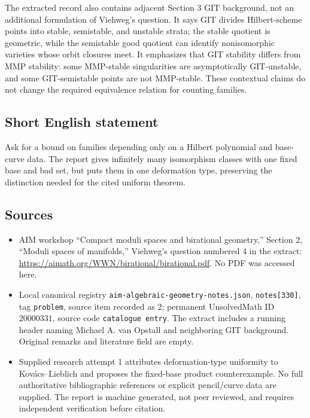 \documentclass[11pt]{article}
\begin{document}
The extracted record also contains adjacent Section 3 GIT background, not an additional formulation of Viehweg's question. It says GIT divides Hilbert-scheme points into stable, semistable, and unstable strata; the stable quotient is geometric, while the semistable good quotient can identify nonisomorphic varieties whose orbit closures meet. It emphasizes that GIT stability differs from MMP stability: some MMP-stable singularities are asymptotically GIT-unstable, and some GIT-semistable points are not MMP-stable. These contextual claims do not change the required equivalence relation for counting families.
\subsection{Short English statement}
Ask for a bound on families depending only on a Hilbert polynomial and base-curve data. The report gives infinitely many isomorphism classes with one fixed base and bad set, but puts them in one deformation type, preserving the distinction needed for the cited uniform theorem.
\subsection{Sources}
\begin{itemize}
\item AIM workshop ``Compact moduli spaces and birational geometry,'' Section 2, ``Moduli spaces of manifolds,'' Viehweg's question numbered 4 in the extract: \url{https://aimath.org/WWN/birational/birational.pdf}. No PDF was accessed here.
\item Local canonical registry \texttt{aim-algebraic-geometry-notes.json}, \texttt{notes[330]}, tag \texttt{problem}, source item recorded as 2; permanent UnsolvedMath ID \(20000331\), source code \texttt{catalogue entry}. The extract includes a running header naming Michael A. van Opstall and neighboring GIT background. Original remarks and literature field are empty.
\item Supplied research attempt 1 attributes deformation-type uniformity to Kov\'acs--Lieblich and proposes the fixed-base product counterexample. No full authoritative bibliographic references or explicit pencil/curve data are supplied. The report is machine generated, not peer reviewed, and requires independent verification before citation.
\end{itemize}
\end{document}
